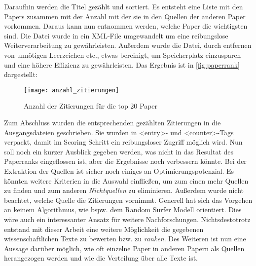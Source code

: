 Daraufhin werden die Titel gezählt und sortiert. Es entsteht eine Liste mit den Papers zusammen mit der Anzahl mit der sie in den Quellen der anderen Paper vorkommen. Daraus kann nun entnommen werden, welche Paper die wichtigsten sind. Die Datei wurde in ein XML-File umgewandelt um eine reibungslose Weiterverarbeitung zu gewährleisten. Außerdem wurde die Datei, durch entfernen von unnötigen Leerzeichen etc., etwas bereinigt, um Speicherplatz einzusparen und eine höhere Effizienz zu gewährleisten. Das Ergebnis ist in \autoref{fig:paperrank} dargestellt:




\begin{figure}[ht]

    \texttt{[image: anzahl\_zitierungen]}
  \caption[]{Anzahl der Zitierungen für die top 20 Paper}
\label{fig:paperrank}
\end{figure}



Zum Abschluss wurden die entsprechenden gezählten Zitierungen in die Ausgangsdateien geschrieben. Sie wurden in <entry>- und <counter>-Tags verpackt, damit im Scoring Schritt ein reibungsloser Zugriff möglich wird.
Nun soll noch ein kurzer Ausblick gegeben werden, was nicht in das Resultat des Paperranks eingeflossen ist, aber die Ergebnisse noch verbessern könnte. Bei der Extraktion der Quellen ist sicher noch einiges an Optimierungspotenzial. Es könnten weitere Kriterien in die Auswahl einfließen, um zum einen mehr Quellen zu finden und zum anderen \emph{Nichtquellen} zu eliminieren. Außerdem wurde nicht beachtet, welche Quelle die Zitierungen vornimmt. Generell hat sich das Vorgehen an keinem Algorithmus, wie bspw. dem Random Surfer Modell orientiert. Dies wäre auch ein interessanter Ansatz für weitere Nachforschungen. 
Nichtsdestotrotz entstand mit dieser Arbeit eine weitere Möglichkeit die gegebenen wissenschaftlichen Texte zu bewerten bzw. zu \emph{ranken}. Des Weiteren ist nun eine Aussage darüber möglich, wie oft einzelne Paper in anderen Papern als Quellen herangezogen werden und wie die  Verteilung über alle Texte ist.



